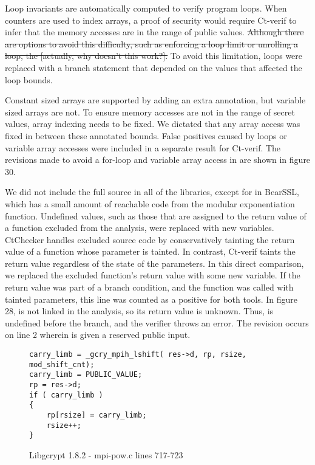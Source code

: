 Loop invariants are automatically computed to verify program loops.  When
counters are used to index arrays, a proof of security would require Ct-verif
to infer that the memory accesses are in the range of public values.  \sout{Although
there are options to avoid this difficulty, such as enforcing a loop limit or
unrolling a loop, the [actually, why doesn't this work?].}  To avoid this
limitation, loops were replaced with a branch statement that depended on the
values that affected the loop bounds.

Constant sized arrays are supported by adding an extra annotation, but variable
sized arrays are not. To ensure memory accesses are not in the range of secret
values, array indexing needs to be fixed.  We dictated that any array access
was fixed in between these annotated bounds.  False positives caused by loops
or variable array accesses were included in a separate result for Ct-verif. The
revisions made to avoid a for-loop and variable array access in 
are shown in figure 30.

We did not include the full source in all of the libraries, except for in BearSSL,
which has a small amount of reachable code from the modular exponentiation function.
Undefined values, such as those that are assigned to the return value of a function
excluded from the analysis, were replaced with new variables.  CtChecker handles
excluded source code by conservatively tainting the return value of a function
whose parameter is tainted.  In contrast, Ct-verif taints the return value
regardless of the state of the parameters.  In this direct comparison, we replaced
the excluded function's return value with some new variable.  If the return value
was part of a branch condition, and the function was called with tainted
parameters, this line was counted as a positive for both tools.
In figure 28,  is not linked in the analysis, so its
return value is unknown.  Thus,  is undefined before the
branch, and the verifier throws an error.  The revision occurs on line 2 wherein
 is given a reserved public input.

\begin{figure}[h!]
\begin{lstlisting}
carry_limb = _gcry_mpih_lshift( res->d, rp, rsize, mod_shift_cnt);
carry_limb = PUBLIC_VALUE;
rp = res->d;
if ( carry_limb )
{
    rp[rsize] = carry_limb;
    rsize++;
}
\end{lstlisting}
\caption{Libgcrypt 1.8.2 - mpi-pow.c lines 717-723}
\label{code:libgcrypt_normalize}
\end{figure}


